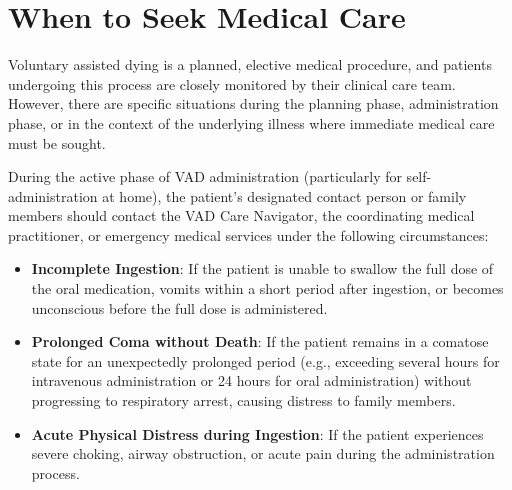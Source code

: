 \section*{When to Seek Medical Care}
Voluntary assisted dying is a planned, elective medical procedure, and patients undergoing this process are closely monitored by their clinical care team. However, there are specific situations during the planning phase, administration phase, or in the context of the underlying illness where immediate medical care must be sought.

During the active phase of VAD administration (particularly for self-administration at home), the patient's designated contact person or family members should contact the VAD Care Navigator, the coordinating medical practitioner, or emergency medical services under the following circumstances:
\begin{itemize}
    \item \textbf{Incomplete Ingestion}: If the patient is unable to swallow the full dose of the oral medication, vomits within a short period after ingestion, or becomes unconscious before the full dose is administered.
    \item \textbf{Prolonged Coma without Death}: If the patient remains in a comatose state for an unexpectedly prolonged period (e.g., exceeding several hours for intravenous administration or 24 hours for oral administration) without progressing to respiratory arrest, causing distress to family members.
    \item \textbf{Acute Physical Distress during Ingestion}: If the patient experiences severe choking, airway obstruction, or acute pain during the administration process.
\end{itemize}

